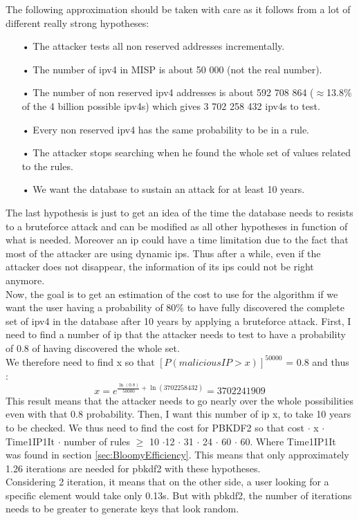 \documentclass{eplmastersthesis}
\begin{document}
The following approximation should be taken with care as it follows from a lot of different really strong hypotheses:
\begin{itemize}
\item[•] The attacker tests all non reserved addresses incrementally.
\item[•] The number of \gls{ipv4} in MISP is about 50 000 (not the real number).
\item[•] The number of non reserved \gls{ipv4} addresses is about 592 708 864 ($\approx$13.8\% of the 4 billion possible \glspl{ipv4}) which gives 3 702 258 432 \glspl{ipv4} to test.
\item[•] Every non reserved \gls{ipv4} has the same probability to be in a rule.
\item[•] The attacker stops searching when he found the whole set of values related to the rules.
\item[•] We want the database to sustain an attack for at least 10 years.
\end{itemize}
The last hypothesis is just to get an idea of the time the database needs to resists to a bruteforce attack and can be modified as all other hypotheses in function of what is needed.
Moreover an \gls{ip} could have a time limitation due to the fact that most of the attacker are using dynamic \glspl{ip}. Thus after a while, even if the attacker does not disappear, the information of its \glspl{ip} could not be right anymore.\\

Now, the goal is to get an estimation of the cost to use for the algorithm if we want the user having a probability of 80\% to have fully discovered the complete set of \gls{ipv4} in the database after 10 years by applying a bruteforce attack.
First, I need to find a number of \gls{ip} that the attacker needs to test to have a probability of 0.8 of having discovered the whole set.\\

We therefore need to find x so that $\left[ P(malicious IP > x)\right]^{50000}$ = 0.8 and thus :
$$x = e^{\frac{\ln(0.8)}{50000} + \ln(3 702 258 432)} = 3702241909$$
This result means that the attacker needs to go nearly over the whole possibilities even with that 0.8 probability.
Then, I want this number of \gls{ip} x, to take 10 years to be checked. We thus need to find the cost for PBKDF2 so that cost $\cdot$ x  $\cdot$ Time1IP1It $\cdot$ number of rules $\geq$ 10 $\cdot$12 $\cdot$ 31 $\cdot$ 24 $\cdot$ 60 $\cdot$ 60. Where Time1IP1It was found in section \ref{sec:BloomyEfficiency}. This means that only approximately 1.26 iterations are needed for \gls{pbkdf2} with these hypotheses.\\
Considering 2 iteration, it means that on the other side, a user looking for a specific element would take only 0.13s. But with \gls{pbkdf2}, the number of iterations needs to be greater to generate keys that look random.\\
\end{document}
